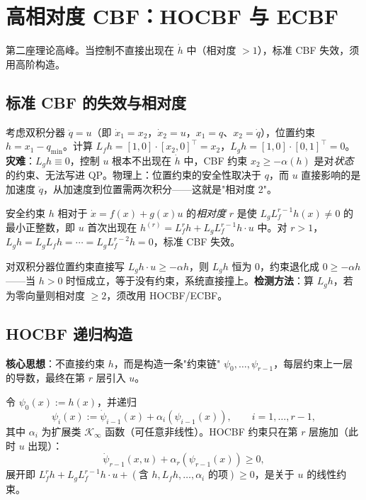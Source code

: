 \section{高相对度 CBF：HOCBF 与 ECBF}
\label{sec:cbf-hocbf}

第二座理论高峰。当控制不直接出现在 $\dot h$ 中（相对度 $>1$），标准 CBF 失效，须用高阶构造。

\subsection{标准 CBF 的失效与相对度}

考虑双积分器 $\ddot q=u$（即 $\dot x_1=x_2$，$\dot x_2=u$，$x_1=q$、$x_2=\dot q$），位置约束 $h=x_1-q_{\min}$。计算 $L_fh=[1,0]\cdot[x_2,0]^\top=x_2$，$L_gh=[1,0]\cdot[0,1]^\top=0$。\textbf{灾难}：$L_gh\equiv0$，控制 $u$ 根本不出现在 $\dot h$ 中，CBF 约束 $x_2\ge-\alpha(h)$ 是对\emph{状态}的约束、无法写进 QP。物理上：位置约束的安全性取决于 $q$，而 $u$ 直接影响的是加速度 $\ddot q$，从加速度到位置需两次积分——这就是"相对度 2"。

\begin{definition}[相对度]\label{def:rel-degree}
安全约束 $h$ 相对于 $\dot x=f(x)+g(x)u$ 的\emph{相对度} $r$ 是使 $L_gL_f^{r-1}h(x)\neq0$ 的最小正整数，即 $u$ 首次出现在 $h^{(r)}=L_f^rh+L_gL_f^{r-1}h\cdot u$ 中。对 $r>1$，$L_gh=L_gL_fh=\cdots=L_gL_f^{r-2}h=0$，标准 CBF 失效。
\end{definition}

\begin{pitfall}
对双积分器位置约束直接写 $L_gh\cdot u\ge-\alpha h$，则 $L_gh$ 恒为 $0$，约束退化成 $0\ge-\alpha h$——当 $h>0$ 时恒成立，等于没有约束，系统直接撞上。\textbf{检测方法}：算 $L_gh$，若为零向量则相对度 $\ge2$，须改用 HOCBF/ECBF。
\end{pitfall}

\subsection{HOCBF 递归构造}

\textbf{核心思想}：不直接约束 $h$，而是构造一条"约束链" $\psi_0,\dots,\psi_{r-1}$，每层约束上一层的导数，最终在第 $r$ 层引入 $u$。

\begin{definition}\label{def:hocbf}
令 $\psi_0(x):=h(x)$，并递归
\begin{equation}
\psi_i(x):=\dot\psi_{i-1}(x)+\alpha_i(\psi_{i-1}(x)),\qquad i=1,\dots,r-1,
\label{eq:hocbf-recur}
\end{equation}
其中 $\alpha_i$ 为扩展类 $\mathcal K_\infty$ 函数（可任意非线性）。HOCBF 约束只在第 $r$ 层施加（此时 $u$ 出现）：
\begin{equation}
\dot\psi_{r-1}(x,u)+\alpha_r(\psi_{r-1}(x))\ge0,
\label{eq:hocbf-constraint}
\end{equation}
展开即 $L_f^rh+L_gL_f^{r-1}h\cdot u+(\text{含 }h,L_fh,\dots,\alpha_i\text{ 的项})\ge0$，是关于 $u$ 的线性约束。
\end{definition}

